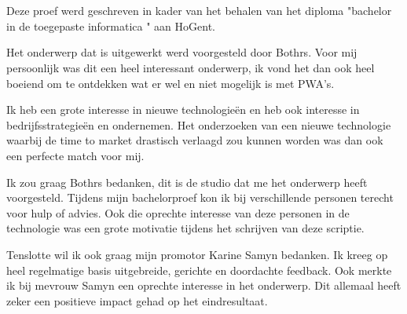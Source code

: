 
\chapter*{}
\label{ch:voorwoord}


Deze proef werd geschreven in kader van het behalen van het diploma "bachelor in de toegepaste informatica " aan HoGent.

Het onderwerp dat is uitgewerkt werd voorgesteld door Bothrs. Voor mij persoonlijk was dit een heel interessant onderwerp, ik vond het dan ook heel boeiend om te ontdekken wat er wel en niet mogelijk is met PWA's.

Ik heb een grote interesse in nieuwe technologieën en heb ook interesse in bedrijfsstrategieën en ondernemen. Het onderzoeken van een nieuwe technologie waarbij de time to market drastisch verlaagd zou kunnen worden was dan ook een perfecte match voor mij. 

Ik zou graag Bothrs bedanken, dit is de studio dat me het onderwerp heeft voorgesteld. 
Tijdens mijn bachelorproef kon ik bij verschillende personen terecht voor hulp of advies. Ook die oprechte interesse van deze personen in de technologie was een grote motivatie tijdens het schrijven van deze scriptie.

Tenslotte wil ik ook graag mijn promotor Karine Samyn bedanken. Ik kreeg op heel regelmatige basis uitgebreide, gerichte en doordachte feedback. Ook merkte ik bij mevrouw Samyn een oprechte interesse in het onderwerp. Dit allemaal heeft zeker een positieve impact gehad op het eindresultaat.